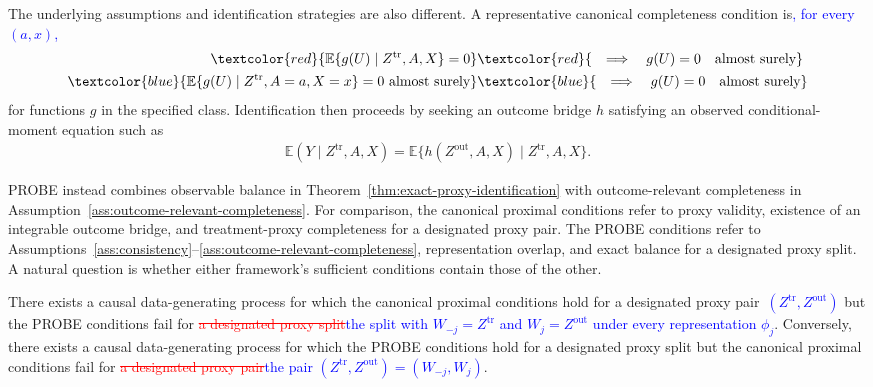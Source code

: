 The underlying assumptions and identification strategies are also different. A representative canonical completeness condition is\textcolor{blue}{, for every $(a,x)$,}
\begin{align}
	\textcolor{red}{\mathbb E\{g(U)\mid Z^{\mathrm{tr}},A,X\}=0}
	&\textcolor{red}{\quad\Longrightarrow\quad
	g(U)=0
	\quad\text{almost surely}}\notag\\
	\textcolor{blue}{\mathbb E\{g(U)\mid Z^{\mathrm{tr}},A=a,X=x\}=0\text{ almost surely}}
	&\textcolor{blue}{\quad\Longrightarrow\quad
	g(U)=0
	\quad\text{almost surely}}
	\label{eq:canonical-proxy-completeness}
\end{align}
for functions $g$ in the specified class. Identification then proceeds by seeking an outcome bridge $h$ satisfying an observed conditional-moment equation such as
	\begin{align}
		\mathbb E(Y\mid Z^{\mathrm{tr}},A,X) =
		\mathbb E\{h(Z^{\mathrm{out}},A,X)\mid Z^{\mathrm{tr}},A,X\}.
		\label{eq:canonical-outcome-bridge}
	\end{align}

PROBE instead combines observable balance in Theorem~\ref{thm:exact-proxy-identification} with outcome-relevant completeness in Assumption~\ref{ass:outcome-relevant-completeness}. For comparison, the canonical proximal conditions refer to proxy validity, existence of an integrable outcome bridge, and treatment-proxy completeness for a designated proxy pair. The PROBE conditions refer to Assumptions~\ref{ass:consistency}--\ref{ass:outcome-relevant-completeness}, representation overlap, and exact balance for a designated proxy split. A natural question is whether either framework's sufficient conditions contain those of the other.

\begin{proposition}
	\label{prop:non-nesting-proximal-probe}
	\normalfont
	There exists a causal data-generating process for which the canonical proximal conditions hold for a designated proxy pair\textcolor{blue}{\ $(Z^{\mathrm{tr}},Z^{\mathrm{out}})$} but the PROBE conditions fail for \textcolor{red}{\sout{a designated proxy split}}\textcolor{blue}{the split with $W_{-j}=Z^{\mathrm{tr}}$ and $W_j=Z^{\mathrm{out}}$ under every representation $\phi_j$}. Conversely, there exists a causal data-generating process for which the PROBE conditions hold for a designated proxy split but the canonical proximal conditions fail for \textcolor{red}{\sout{a designated proxy pair}}\textcolor{blue}{the pair $(Z^{\mathrm{tr}},Z^{\mathrm{out}})=(W_{-j},W_j)$}.
\end{proposition}

